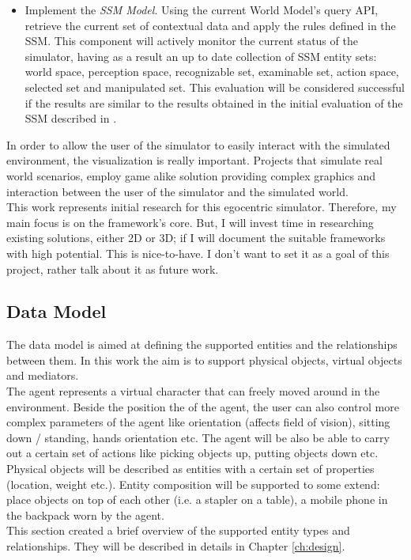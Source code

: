 \begin{enumerate}
\begin{itemize}
			\item Implement the \emph{SSM Model}. Using the current World Model's query API, retrieve the current set of contextual data and apply the rules defined in the SSM. This component will actively monitor the current status of the simulator, having as a result an up to date collection of SSM entity sets: world space, perception space, recognizable set, examinable set, action space, selected set and manipulated set. This evaluation will be considered successful if the results are similar to the results obtained in the initial evaluation of the SSM described in \cite{pederson2011situative}.
		\end{itemize}
\end{enumerate}

In order to allow the user of the simulator to easily interact with the simulated environment, the visualization is really important. Projects that simulate real world scenarios, employ game alike solution providing complex graphics and interaction between the user of the simulator and the simulated world.\\

This work represents initial research for this egocentric simulator. Therefore, my main focus is on the framework's core. But, I will invest time in researching existing solutions, either 2D or 3D; if I will document the suitable frameworks with high potential. This is nice-to-have. I don't want to set it as a goal of this project, rather talk about it as future work.

\subsection{Data Model}\label{sec:data_model}
The data model is aimed at defining the supported entities and the relationships between them. In this work the aim is to support physical objects, virtual objects and mediators.\\

The agent represents a virtual character that can freely moved around in the environment. Beside the position the of the agent, the user can also control more complex parameters of the agent like orientation (affects field of vision), sitting down / standing, hands orientation etc. The agent will be also be able to carry out a certain set of actions like picking objects up, putting objects down etc.\\

Physical objects will be described as entities with a certain set of properties (location, weight etc.). Entity composition will be supported to some extend: place objects on top of each other (i.e. a stapler on a table), a mobile phone in the backpack worn by the agent.\\

This section created a brief overview of the supported entity types and relationships. They will be described in details in Chapter \ref{ch:design}.
